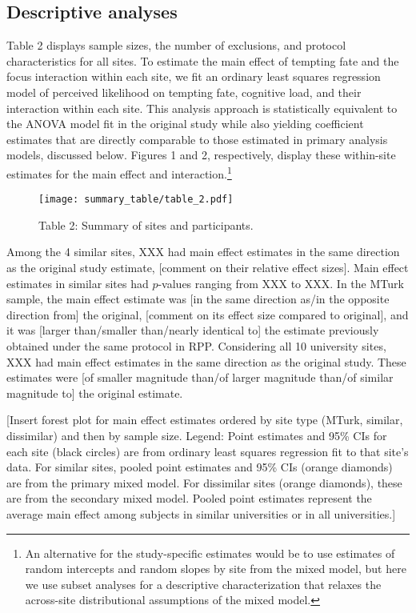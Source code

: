 \documentclass[english,floatsintext,man]{apa6}
\theoremstyle{definition}
\theoremstyle{definition}
\theoremstyle{definition}
\theoremstyle{remark}
\begin{document}
\subsection{Descriptive analyses}\label{descriptive-analyses}

Table 2 displays sample sizes, the number of exclusions, and protocol
characteristics for all sites. To estimate the main effect of tempting
fate and the focus interaction within each site, we fit an ordinary
least squares regression model of perceived likelihood on tempting fate,
cognitive load, and their interaction within each site. This analysis
approach is statistically equivalent to the ANOVA model fit in the
original study while also yielding coefficient estimates that are
directly comparable to those estimated in primary analysis models,
discussed below. Figures 1 and 2, respectively, display these
within-site estimates for the main effect and interaction.\footnote{An
  alternative for the study-specific estimates would be to use estimates
  of random intercepts and random slopes by site from the mixed model,
  but here we use subset analyses for a descriptive characterization
  that relaxes the across-site distributional assumptions of the mixed
  model.}

\begin{figure}
\centering
\texttt{[image: summary\_table/table\_2.pdf]}
\caption{Table 2: Summary of sites and participants.}
\end{figure}

Among the 4 similar sites, XXX had main effect estimates in the same
direction as the original study estimate, {[}comment on their relative
effect sizes{]}. Main effect estimates in similar sites had \(p\)-values
ranging from XXX to XXX. In the MTurk sample, the main effect estimate
was {[}in the same direction as/in the opposite direction from{]} the
original, {[}comment on its effect size compared to original{]}, and it
was {[}larger than/smaller than/nearly identical to{]} the estimate
previously obtained under the same protocol in RPP. Considering all 10
university sites, XXX had main effect estimates in the same direction as
the original study. These estimates were {[}of smaller magnitude than/of
larger magnitude than/of similar magnitude to{]} the original estimate.

{[}Insert forest plot for main effect estimates ordered by site type
(MTurk, similar, dissimilar) and then by sample size. Legend: Point
estimates and 95\% CIs for each site (black circles) are from ordinary
least squares regression fit to that site's data. For similar sites,
pooled point estimates and 95\% CIs (orange diamonds) are from the
primary mixed model. For dissimilar sites (orange diamonds), these are
from the secondary mixed model. Pooled point estimates represent the
average main effect among subjects in similar universities or in all
universities.{]}
\end{document}
